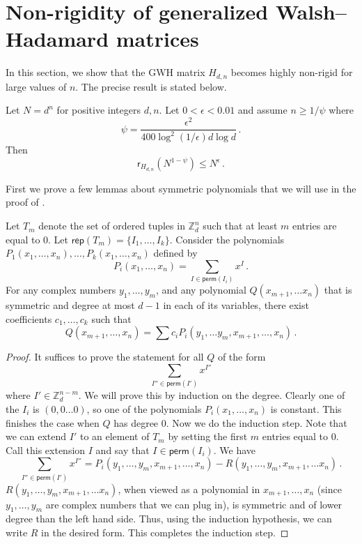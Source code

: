 \documentclass{toc}
\renewcommand\Z{{\mathbb{Z}}}
\newcommand\perm{\textsf{perm}}
\newcommand\rep{\textsf{rep}}
\begin{document}
%
%
\section{Non-rigidity of generalized Walsh--Hadamard matrices}
\label{sec_Hadamard}
In this section, we show that the %
GWH  %
matrix $H_{d,n}$ becomes highly non-rigid for large values of $n$.  The precise result is stated below.
\begin{theorem} \label{Hadamard}
Let $N = d^n$ for positive integers $d,n$.   Let $0 < \epsilon < 0.01 $ and assume $n \geq 1/\psi$ where \[\psi = \frac{\epsilon^2 }{400\log^2 (1/\epsilon) d \log d} \,.\]
Then
\[
\textsf{r}_{H_{d,n}}\left(N^{1 - \psi}\right) \leq N^{ \epsilon} \,.
\]
\end{theorem}

First we prove a few lemmas about symmetric polynomials that we will use in the proof of .
\begin{lemma}\label{symmetric}
  Let $T_m$ denote the set of ordered tuples in $\Z_d^n$ such that at least $m$ entries are equal to $0$.
%
Let   %
$\rep(T_m) = \{I_1, \dots , I_k \}$.  Consider the  polynomials $P_1(x_1, \dots , x_n), \dots , P_k(x_1, \dots , x_n)$ defined by
\[
P_i(x_1, \dots , x_n) = \sum_{I \in \perm(I_i)} x^{I} \,.
\]
For any complex numbers  $y_1, \dots , y_m$, and any polynomial $Q(x_{m+1}, \dots x_n)$ that is symmetric and degree at most $d-1$ in each of its variables, there exist coefficients $c_1, \dots , c_k$ such that 
\[
Q(x_{m+1}, \dots , x_n) = \sum c_iP_i(y_1, \dots y_m, x_{m+1}, \dots , x_n) \,.
\]
\end{lemma}
\begin{proof}
It suffices to prove the statement for all $Q$ of the form 
\[
\sum_{I'' \in \perm(I')} x^{I''}
\]
where $I' \in \Z_d^{n-m}$.  We will prove this by induction on the degree.  Clearly one of the $I_i$ is $(0,0 \dots 0)$, so one of the polynomials $P_i(x_1, \dots , x_n)$ is constant.  This finishes the case when $Q$ has degree $0$.  Now we do the induction step.  Note that we can extend $I'$ to an element of $T_m$ by setting the first $m$ entries equal to $0$.  Call this extension $I$ and say that $I \in \perm(I_i)$.  We have
\[
\sum_{I'' \in \perm(I')} x^{I''} = P_i(y_1, \dots ,y_m, x_{m+1}, \dots , x_n) - R(y_1, \dots , y_m, x_{m+1}, \dots x_n) \,.
\]
$R(y_1, \dots , y_m, x_{m+1}, \dots x_n)$, when viewed as a polynomial in $x_{m+1}, \dots , x_n$ (since $y_1, \dots , y_m$ are complex numbers that we can plug in), is symmetric and of lower degree than the left hand side.  Thus, using the induction hypothesis, we can write $R$ in the desired form.  This completes the induction step.  
\end{proof}
\end{document}
